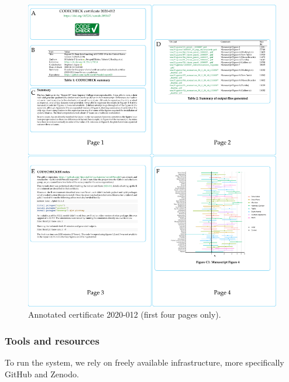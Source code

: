 \documentclass[12pt]{article}
\begin{document}
\begin{figure}
  \centering
  \includegraphics[width=\textwidth]{figs/annotate-cert-crop.pdf}
  \caption{Annotated certificate 2020-012 (first four pages only).}
  \label{fig:cert}
\end{figure}

\subsubsection*{Tools and resources}\label{tools}

To run the system, we rely on freely available infrastructure, more 
specifically GitHub and Zenodo.
\end{document}
